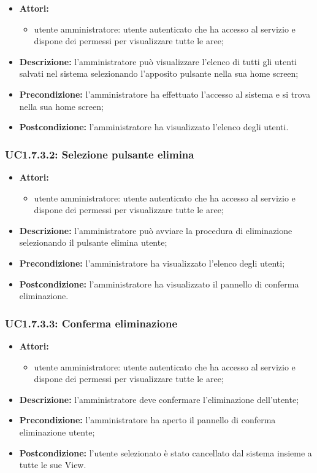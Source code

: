\begin{itemize}
	\item \textbf{Attori:}
	\begin{itemize}
		\item utente amministratore: utente autenticato che ha accesso al servizio e dispone dei permessi per visualizzare tutte le aree;
	\end{itemize}
	\item \textbf{Descrizione:} l'amministratore può visualizzare l'elenco di tutti gli utenti salvati nel sistema selezionando l'apposito pulsante nella sua home screen;
	\item \textbf{Precondizione:} l'amministratore ha effettuato l'accesso al sistema e si trova nella sua home screen;
	\item \textbf{Postcondizione:} l'amministratore ha visualizzato l'elenco degli utenti.
\end{itemize}

\subsubsection{UC1.7.3.2: Selezione pulsante elimina}

\begin{itemize}
	\item \textbf{Attori:}
	\begin{itemize}
		\item utente amministratore: utente autenticato che ha accesso al servizio e dispone dei permessi per visualizzare tutte le aree;
	\end{itemize}
	\item \textbf{Descrizione:} l'amministratore può avviare la procedura di eliminazione selezionando il pulsante elimina utente;
	\item \textbf{Precondizione:} l'amministratore ha visualizzato l'elenco degli utenti;
	\item \textbf{Postcondizione:} l'amministratore ha visualizzato il pannello di conferma eliminazione.
\end{itemize}

\subsubsection{UC1.7.3.3: Conferma eliminazione}

\begin{itemize}
	\item \textbf{Attori:}
	\begin{itemize}
		\item utente amministratore: utente autenticato che ha accesso al servizio e dispone dei permessi per visualizzare tutte le aree;
	\end{itemize}
	\item \textbf{Descrizione:} l'amministratore deve confermare l'eliminazione dell'utente;
	\item \textbf{Precondizione:} l'amministratore ha aperto il pannello di conferma eliminazione utente;
	\item \textbf{Postcondizione:} l'utente selezionato è stato cancellato dal sistema insieme a tutte le sue View.
\end{itemize}


